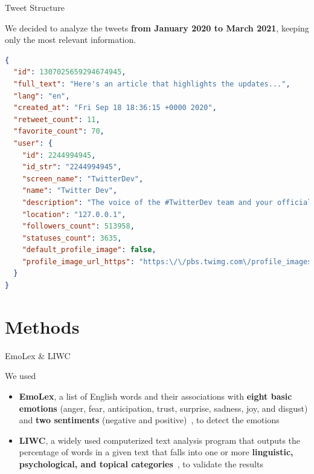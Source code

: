 \documentclass[8pt]{beamer}  %
\begin{document}
\begin{frame}[fragile]{Tweet Structure}

    We decided to analyze the tweets \textbf{from January 2020 to March 2021}, keeping only the most relevant information.
	
    \begin{lstlisting}[language=json, caption={Final json object for a tweet}, captionpos=b, label={lst:tweet_json}]
{
  "id": 1307025659294674945,
  "full_text": "Here's an article that highlights the updates...",
  "lang": "en",
  "created_at": "Fri Sep 18 18:36:15 +0000 2020",
  "retweet_count": 11,
  "favorite_count": 70,
  "user": {
    "id": 2244994945,
    "id_str": "2244994945",
    "screen_name": "TwitterDev",
    "name": "Twitter Dev",
    "description": "The voice of the #TwitterDev team and your official...",
    "location": "127.0.0.1",
    "followers_count": 513958,
    "statuses_count": 3635,
    "default_profile_image": false,
    "profile_image_url_https": "https:\/\/pbs.twimg.com\/profile_images\/1283786620521652229\/lEODkLTh_normal.jpg"
  }
}
    \end{lstlisting}
	
\end{frame}

\section{Methods}

\begin{frame}{EmoLex \& LIWC}

    We used
    
    \begin{itemize}
        \item \textbf{EmoLex}, a list of English words and their associations with \textbf{eight basic emotions} (anger, fear, anticipation, trust, surprise, sadness, joy, and disgust) and \textbf{two sentiments} (negative and positive)~\autocite{ncrwebsite}, to detect the emotions
        \item \textbf{LIWC}, a widely used computerized text analysis program that outputs the percentage of words in a given text that falls into one or more \textbf{linguistic, psychological, and topical categories}~\autocite{enwiki:1023542720}, to validate the results
    \end{itemize}

\end{frame}
\end{document}
